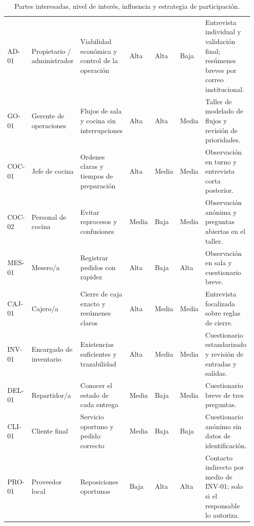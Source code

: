 \begin{table}[htbp]
\centering
\footnotesize
\begin{tabularx}{\linewidth}{|l|p{1.9cm}|Y|p{1.2cm}|p{1.7cm}|p{1.8cm}|X|}
\hline
{} &  &  &  &  &  & \\
\hline
AD-01 & Propietario / administrador & Viabilidad econ\'omica y control de la operaci\'on & Alta & Alta & Baja & Entrevista individual y validaci\'on final; res\'umenes breves por correo institucional.\\
\hline
GO-01 & Gerente de operaciones & Flujos de sala y cocina sin interrupciones & Alta & Alta & Media & Taller de modelado de flujos y revisi\'on de prioridades.\\
\hline
COC-01 & Jefe de cocina & Ordenes claras y tiempos de preparaci\'on & Alta & Media & Media & Observaci\'on en turno y entrevista corta posterior.\\
\hline
COC-02 & Personal de cocina & Evitar reprocesos y confusiones & Media & Baja & Media & Observaci\'on an\'onima y preguntas abiertas en el taller.\\
\hline
MES-01 & Mesero/a & Registrar pedidos con rapidez & Alta & Baja & Alta & Observaci\'on en sala y cuestionario breve.\\
\hline
CAJ-01 & Cajero/a & Cierre de caja exacto y res\'umenes claros & Alta & Media & Media & Entrevista focalizada sobre reglas de cierre.\\
\hline
INV-01 & Encargado de inventario & Existencias suficientes y trazabilidad & Alta & Media & Media & Cuestionario estandarizado y revisi\'on de entradas y salidas.\\
\hline
DEL-01 & Repartidor/a & Conocer el estado de cada entrega & Media & Baja & Media & Cuestionario breve de tres preguntas.\\
\hline
CLI-01 & Cliente final & Servicio oportuno y pedido correcto & Media & Baja & Baja & Cuestionario an\'onimo sin datos de identificaci\'on.\\
\hline
PRO-01 & Proveedor local & Reposiciones oportunas & Baja & Alta & Alta & Contacto indirecto por medio de INV-01; solo si el responsable lo autoriza.\\
\hline
\end{tabularx}
\caption{Partes interesadas, nivel de inter\'es, influencia y estrategia de participaci\'on.}
\label{tab:stakeholders}
\end{table}

